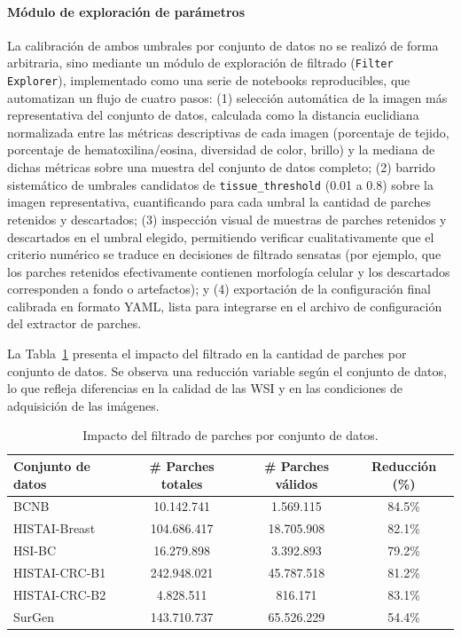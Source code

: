 \paragraph{Módulo de exploración de parámetros} La calibración de ambos umbrales por conjunto de datos no se realizó de forma arbitraria, sino mediante un módulo de exploración de filtrado (\texttt{Filter Explorer}), implementado como una serie de notebooks reproducibles, que automatizan un flujo de cuatro pasos: (1) selección automática de la imagen más representativa del conjunto de datos, calculada como la distancia euclidiana normalizada entre las métricas descriptivas de cada imagen (porcentaje de tejido, porcentaje de hematoxilina/eosina, diversidad de color, brillo) y la mediana de dichas métricas sobre una muestra del conjunto de datos completo; (2) barrido sistemático de umbrales candidatos de \texttt{tissue\_threshold} (0.01 a 0.8) sobre la imagen representativa, cuantificando para cada umbral la cantidad de parches retenidos y descartados; (3) inspección visual de muestras de parches retenidos y descartados en el umbral elegido, permitiendo verificar cualitativamente que el criterio numérico se traduce en decisiones de filtrado sensatas (por ejemplo, que los parches retenidos efectivamente contienen morfología celular y los descartados corresponden a fondo o artefactos); y (4) exportación de la configuración final calibrada en formato YAML, lista para integrarse en el archivo de configuración del extractor de parches.

La Tabla~\ref{tab:impacto_filtrado} presenta el impacto del filtrado en la cantidad de parches por conjunto de datos. Se observa una reducción variable según el conjunto de datos, lo que refleja diferencias en la calidad de las WSI y en las condiciones de adquisición de las imágenes.

\begin{table}[htbp]
    \centering
    \caption{Impacto del filtrado de parches por conjunto de datos.}
    \label{tab:impacto_filtrado}
    \begin{tabular}{p{3.5cm} c c c}
        \toprule
        \textbf{Conjunto de datos} & \textbf{\# Parches totales} & \textbf{\# Parches válidos} & \textbf{Reducción (\%)} \\
        \midrule
        BCNB & 10.142.741 & 1.569.115 & 84.5\% \\
        HISTAI-Breast & 104.686.417 & 18.705.908 & 82.1\% \\
        HSI-BC & 16.279.898 & 3.392.893 & 79.2\% \\
        HISTAI-CRC-B1 & 242.948.021 & 45.787.518 & 81.2\% \\
        HISTAI-CRC-B2 & 4.828.511 & 816.171 & 83.1\% \\
        SurGen & 143.710.737 & 65.526.229 & 54.4\% \\
        \bottomrule
    \end{tabular}
\end{table}


